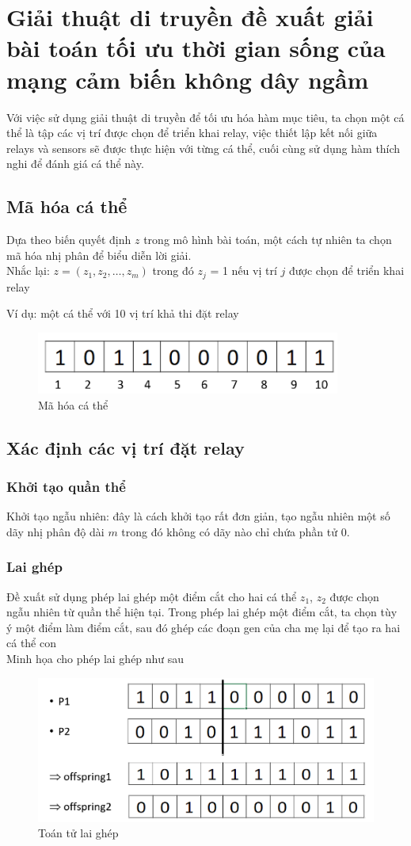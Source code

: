 \chapter{Giải thuật di truyền đề xuất giải bài toán tối ưu thời gian sống của mạng cảm biến không dây ngầm}
Với việc sử dụng giải thuật di truyền để tối ưu hóa hàm mục tiêu, ta chọn một cá thể là tập các vị trí được chọn để triển khai relay, việc thiết lập kết nối giữa relays và sensors sẽ được thực hiện với từng cá thể, cuối cùng sử dụng hàm thích nghi để đánh giá cá thể này.
\section{Mã hóa cá thể}
Dựa theo biến quyết định $z$ trong mô hình bài toán, một cách tự nhiên ta chọn mã hóa nhị phân để biểu diễn lời giải.
\\Nhắc lại: $z = (z_1, z_2,…, z_m)$ trong đó $z_j$ = 1 nếu vị trí $j$ được chọn để triển khai relay

Ví dụ: một cá thể với 10 vị trí khả thi đặt relay

\begin{figure}[h]
    \centering
    \includegraphics[width=10cm]{picture/indi_encoding.png}
    \caption{Mã hóa cá thể }
\end{figure}

\section{Xác định các vị trí đặt relay}
\subsection{Khởi tạo quần thể}
Khởi tạo ngẫu nhiên: đây là cách khởi tạo rất đơn giản, tạo ngẫu nhiên một số dãy nhị phân độ dài $m$ trong đó không có dãy nào chỉ chứa phần tử 0.
\subsection{Lai ghép}
Đề xuất sử dụng phép lai ghép một điểm cắt cho hai cá thể $z_1$, $z_2$ được chọn ngẫu nhiên từ quần thể hiện tại. Trong phép lai ghép một điểm cắt, ta chọn tùy ý một điểm làm điểm cắt, sau đó ghép các đoạn gen của cha mẹ lại để tạo ra hai cá thể con 
\\Minh họa cho phép lai ghép như sau
\begin{figure}[H]
    \centering
    \includegraphics[width=0.8\linewidth]{picture/crossover.png}
    \caption{Toán tử lai ghép}
\end{figure}
